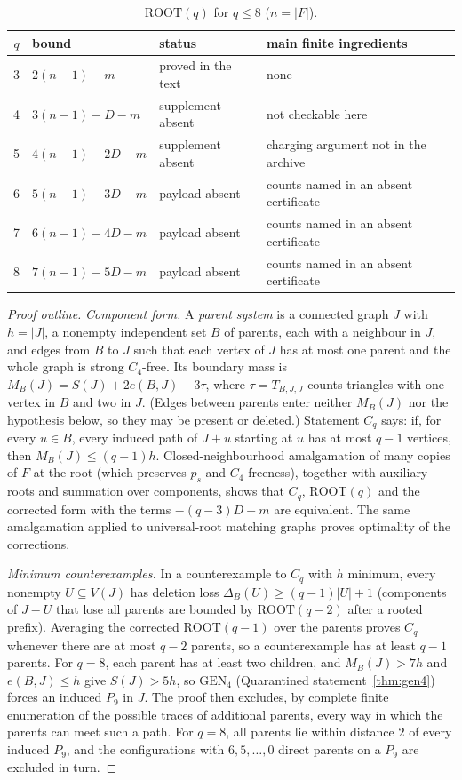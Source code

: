\documentclass[11pt]{amsart}
\theoremstyle{definition}
\theoremstyle{remark}
\newcommand{\pp}{p}
\newcommand{\GEN}{\mathrm{GEN}}
\newcommand{\ROOT}{\mathrm{ROOT}}
\begin{document}
\begin{table}[ht]
\centering\small
\begin{tabular}{@{}cllp{7.2cm}@{}}
\toprule
$q$ & bound & status & main finite ingredients\\
\midrule
3 & $2(n-1)-m$ & proved in the text & none\\
4 & $3(n-1)-D-m$ & supplement absent & not checkable here\\
5 & $4(n-1)-2D-m$ & supplement absent & charging argument not in the archive\\
6 & $5(n-1)-3D-m$ & payload absent & counts named in an absent certificate\\
7 & $6(n-1)-4D-m$ & payload absent & counts named in an absent certificate\\
8 & $7(n-1)-5D-m$ & payload absent & counts named in an absent certificate\\
\bottomrule
\end{tabular}
\caption{$\ROOT(q)$ for $q\le8$ ($n=|F|$).}\label{tab:root}
\end{table}

\begin{proof}[Proof outline]
\emph{Component form.} A \emph{parent system} is a connected graph $J$ with $h=|J|$, a nonempty independent set $B$ of parents, each with a neighbour in $J$, and edges from $B$ to $J$ such that each vertex of $J$ has at most one parent and the whole graph is strong $C_4$-free. Its boundary mass is $M_B(J)=S(J)+2e(B,J)-3\tau$, where $\tau=T_{B,J,J}$ counts triangles with one vertex in $B$ and two in $J$. (Edges between parents enter neither $M_B(J)$ nor the hypothesis below, so they may be present or deleted.) Statement $C_q$ says: if, for every $u\in B$, every induced path of $J+u$ starting at $u$ has at most $q-1$ vertices, then $M_B(J)\le(q-1)h$. Closed-neighbourhood amalgamation of many copies of $F$ at the root (which preserves $\pp_s$ and $C_4$-freeness), together with auxiliary roots and summation over components, shows that $C_q$, $\ROOT(q)$ and the corrected form with the terms $-(q-3)D-m$ are equivalent. The same amalgamation applied to universal-root matching graphs proves optimality of the corrections.

\emph{Minimum counterexamples.} In a counterexample to $C_q$ with $h$ minimum, every nonempty $U\subseteq V(J)$ has deletion loss $\Delta_B(U)\ge(q-1)|U|+1$ (components of $J-U$ that lose all parents are bounded by $\ROOT(q-2)$ after a rooted prefix). Averaging the corrected $\ROOT(q-1)$ over the parents proves $C_q$ whenever there are at most $q-2$ parents, so a counterexample has at least $q-1$ parents. For $q=8$, each parent has at least two children, and $M_B(J)>7h$ and $e(B,J)\le h$ give $S(J)>5h$, so $\GEN_4$ (Quarantined statement~\ref{thm:gen4}) forces an induced $P_9$ in $J$. The proof then excludes, by complete finite enumeration of the possible traces of additional parents, every way in which the parents can meet such a path. For $q=8$, all parents lie within distance $2$ of every induced $P_9$, and the configurations with $6,5,\dots,0$ direct parents on a $P_9$ are excluded in turn.
\end{proof}
\end{document}
